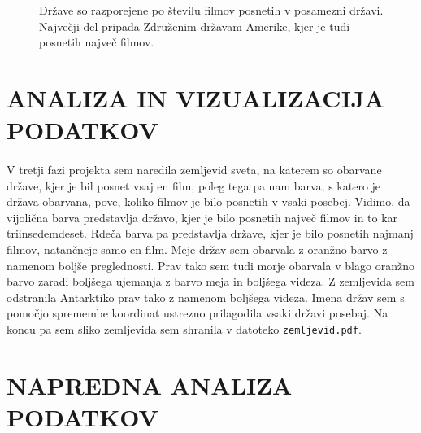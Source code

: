 \documentclass[11pt,a4paper]{article}
\begin{document}
\pagebreak
\begin{figure}[H]

\caption{Države so razporejene po številu filmov posnetih v posamezni državi. Največji del pripada Združenim državam Amerike, kjer je tudi posnetih največ filmov.}
\end{figure}

\pagebreak
\section{ANALIZA IN VIZUALIZACIJA PODATKOV}

\paragraph{} V tretji fazi projekta sem naredila zemljevid sveta, na katerem so obarvane države, kjer je bil posnet vsaj en film, poleg tega pa nam barva, s katero je država obarvana, pove, koliko filmov je bilo posnetih v vsaki posebej. Vidimo, da vijolična barva predstavlja državo, kjer je bilo posnetih največ filmov in to kar  triinsedemdeset. Rdeča barva pa predstavlja države, kjer je bilo posnetih najmanj filmov, natančneje samo en film. Meje držav sem obarvala z oranžno barvo z namenom boljše preglednosti. Prav tako sem tudi morje obarvala v blago oranžno barvo zaradi boljšega ujemanja z barvo meja in boljšega videza. Z zemljevida sem odstranila Antarktiko prav tako z namenom boljšega videza. Imena držav sem s pomočjo spremembe koordinat ustrezno prilagodila vsaki državi posebaj. Na koncu pa sem sliko zemljevida sem shranila v datoteko \verb|zemljevid.pdf|.





\pagebreak
\section{NAPREDNA ANALIZA PODATKOV}
 
\end{document}

